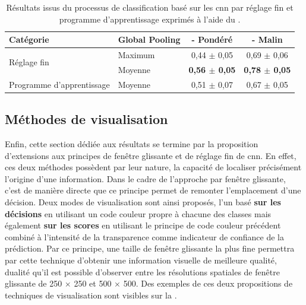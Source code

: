 \begin{table}[H]
    \centering
    \begin{tabular}{llcc}
        \toprule
        Catégorie                               & Global Pooling                    & \Fscore{} - Pondéré                           & \Fscore{} - Malin                             \\ \midrule
        \multirow{2}{*}{Réglage fin}            & Maximum                           & 0,44 $\pm$ 0,05                                 & 0,69 $\pm$ 0,06                                 \\ \cline{2-4}
                                                & \cellcolor[HTML]{E7E6E6}Moyenne   & \cellcolor[HTML]{E7E6E6}\textbf{0,56 $\pm$ 0,05}& \cellcolor[HTML]{E7E6E6}\textbf{0,78 $\pm$ 0,05}\\ \midrule
        Programme d'apprentissage               & Moyenne                           & 0,51 $\pm$ 0,07                                 & 0,67 $\pm$ 0,05                                 \\
        \bottomrule
    \end{tabular}
    
    \caption{Résultats issus du processus de classification basé sur les \gls{cnn} par réglage fin et programme d'apprentissage exprimés à l'aide du \fscore.}
    \label{tab:parameters_image_improvement_fine}
\end{table}
\clearpage

\subsection{Méthodes de visualisation}
Enfin, cette section dédiée aux résultats se termine par la proposition d'extensions aux principes de fenêtre glissante et de réglage fin de \gls{cnn}. En effet, ces deux méthodes possèdent par leur nature, la capacité de localiser précisément l'origine d'une information. Dans le cadre de l'approche par fenêtre glissante, c'est de manière directe que ce principe permet de remonter l'emplacement d'une décision. Deux modes de visualisation sont ainsi proposés, l'un basé \textbf{sur les décisions} en utilisant un code couleur propre à chacune des classes mais également \textbf{sur les scores} en utilisant le principe de code couleur précédent combiné à l'intensité de la transparence comme indicateur de confiance de la prédiction. Par ce principe, une taille de fenêtre glissante la plus fine permettra par cette technique d'obtenir une information visuelle de meilleure qualité, dualité qu'il est possible d'observer entre les résolutions spatiales de fenêtre glissante de 250 $\times$ 250 et 500 $\times$ 500. Des exemples de ces deux propositions de techniques de visualisation sont visibles sur la .\par

